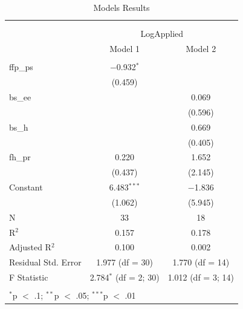 \documentclass[]{elsarticle} %
\begin{document}
\begin{table}[!htbp] \centering 
  \caption{Models Results} 
  \label{} 
\begin{tabular}{@{\extracolsep{5pt}}lcc} 
\\[-1.8ex]\hline \\[-1.8ex] 
\\[-1.8ex] & \multicolumn{2}{c}{LogApplied} \\ 
 & Model 1 & Model 2 \\ 
\hline \\[-1.8ex] 
 ffp\_ps & $-$0.932$^{*}$ &  \\ 
  & (0.459) &  \\ 
  bs\_ee &  & 0.069 \\ 
  &  & (0.596) \\ 
  bs\_h &  & 0.669 \\ 
  &  & (0.405) \\ 
  fh\_pr & 0.220 & 1.652 \\ 
  & (0.437) & (2.145) \\ 
  Constant & 6.483$^{***}$ & $-$1.836 \\ 
  & (1.062) & (5.945) \\ 
 N & 33 & 18 \\ 
R$^{2}$ & 0.157 & 0.178 \\ 
Adjusted R$^{2}$ & 0.100 & 0.002 \\ 
Residual Std. Error & 1.977 (df = 30) & 1.770 (df = 14) \\ 
F Statistic & 2.784$^{*}$ (df = 2; 30) & 1.012 (df = 3; 14) \\ 
\hline \\[-1.8ex] 
\multicolumn{3}{l}{$^{*}$p $<$ .1; $^{**}$p $<$ .05; $^{***}$p $<$ .01} \\ 
\end{tabular} 
\end{table}
\end{document}
